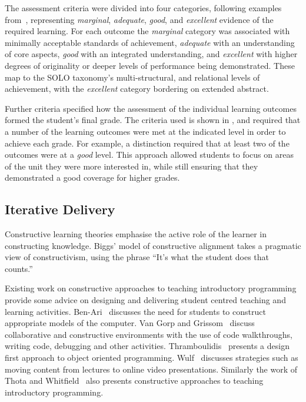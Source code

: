 The assessment criteria were divided into four categories, following examples from~\cite{Biggs:2007}, representing \emph{marginal}, \emph{adequate}, \emph{good}, and \emph{excellent} evidence of the required learning. For each outcome the \emph{marginal} category was associated with minimally acceptable standards of achievement, \emph{adequate} with an understanding of core aspects, \emph{good} with an integrated understanding, and \emph{excellent} with higher degrees of originality or deeper levels of performance being demonstrated. These map to the SOLO taxonomy's multi-structural, and relational levels of achievement, with the \emph{excellent} category bordering on extended abstract.

Further criteria specified how the assessment of the individual learning outcomes formed the student's final grade. The criteria used is shown in , and required that a number of the learning outcomes were met at the indicated level in order to achieve each grade. For example, a distinction required that at least two of the outcomes were at a \emph{good} level. This approach allowed students to focus on areas of the unit they were more interested in, while still ensuring that they demonstrated a good coverage for higher grades.


\subsection{Iterative Delivery} %
\label{sub:iterative_delivery}

Constructive learning theories emphasise the active role of the learner in constructing knowledge. Biggs' model of constructive alignment takes a pragmatic view of constructivism, using the phrase ``It's what the student does that counts.''~\cite{Biggs:1996c} %

Existing work on constructive approaches to teaching introductory programming provide some advice on designing and delivering student centred teaching and learning activities. Ben-Ari~\cite{BenAri:1998} discusses the need for students to construct appropriate models of the computer. Van Gorp and Grissom~\cite{VanGorp:2001} discuss collaborative and constructive environments with the use of code walkthroughs, writing code, debugging and other activities. Thramboulidis~\cite{Thramboulidis:2003a} presents a design first approach to object oriented programming. Wulf~\cite{Wulf:2005} discusses strategies such as moving content from lectures to online video presentations. Similarly the work of Thota and Whitfield~\cite{Thota:2010} also presents constructive approaches to teaching introductory programming.

